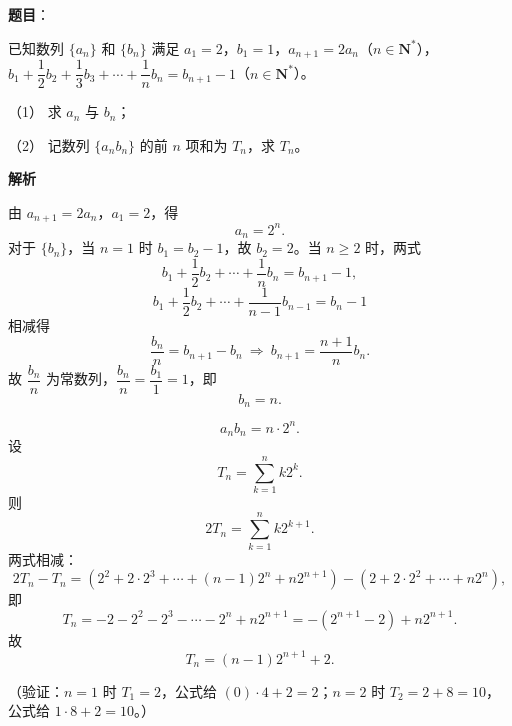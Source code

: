 \begin{answer}

\textbf{题目}：

已知数列 \(\{a_n\}\) 和 \(\{b_n\}\) 满足 \(a_1=2\)，\(b_1=1\)，\(a_{n+1}=2a_n\)（\(n\in\mathbf{N}^*\)），\(b_1+\dfrac{1}{2}b_2+\dfrac{1}{3}b_3+\cdots+\dfrac{1}{n}b_n=b_{n+1}-1\)（\(n\in\mathbf{N}^*\)）。

（1） 求 \(a_n\) 与 \(b_n\)；

（2） 记数列 \(\{a_nb_n\}\) 的前 \(n\) 项和为 \(T_n\)，求 \(T_n\)。

\textbf{解析}


由 \(a_{n+1}=2a_n\)，\(a_1=2\)，得
\nopagebreak[4]
\[
a_n=2^n.
\]
对于 \(\{b_n\}\)，当 \(n=1\) 时 \(b_1=b_2-1\)，故 \(b_2=2\)。当 \(n\geqslant2\) 时，两式
\nopagebreak[4]
\[
b_1+\frac12b_2+\cdots+\frac1n b_n=b_{n+1}-1,
\]
\nopagebreak[4]
\[
b_1+\frac12b_2+\cdots+\frac1{n-1}b_{n-1}=b_n-1
\]
相减得
\nopagebreak[4]
\[
\frac{b_n}{n}=b_{n+1}-b_n
\ \Longrightarrow\ b_{n+1}=\frac{n+1}{n}b_n.
\]
故 \(\dfrac{b_n}{n}\) 为常数列，\(\dfrac{b_n}{n}=\dfrac{b_1}{1}=1\)，即
\nopagebreak[4]
\[
b_n=n.
\]


\nopagebreak[4]
\[
a_nb_n=n\cdot2^n.
\]
设
\nopagebreak[4]
\[
T_n=\sum_{k=1}^{n}k2^k.
\]
则
\nopagebreak[4]
\[
2T_n=\sum_{k=1}^{n}k2^{k+1}.
\]
两式相减：
\nopagebreak[4]
\[
2T_n-T_n
=\left(2^2+2\cdot2^3+\cdots+(n-1)2^n+n2^{n+1}\right)
-\left(2+2\cdot2^2+\cdots+n2^n\right),
\]
即
\nopagebreak[4]
\[
T_n=-2-2^2-2^3-\cdots-2^n+n2^{n+1}
=-\left(2^{n+1}-2\right)+n2^{n+1}.
\]
故
\nopagebreak[4]
\[
T_n=(n-1)2^{n+1}+2.
\]

（验证：\(n=1\) 时 \(T_1=2\)，公式给 \((0)\cdot4+2=2\)；\(n=2\) 时 \(T_2=2+8=10\)，公式给 \(1\cdot8+2=10\)。）



\end{answer}
